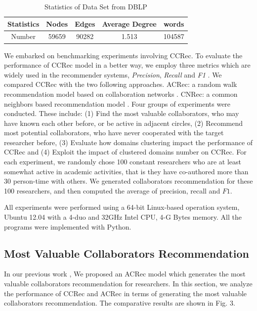 \documentclass[review]{elsarticle}
\begin{document}
\begin{table}
\renewcommand{\arraystretch}{1.2}
\centering
\caption{Statistics of Data Set from DBLP}
\begin{tabular}{|c|c|c|c|c|} \hline
Statistics &Nodes&Edges&Average Degree&words\\ \hline
Number & 59659 &90282 &1.513 &104587\\
\hline\end{tabular}
\end{table}


We embarked on benchmarking experiments involving CCRec. To evaluate the performance of CCRec model in a better way, we employ three metrics which are widely used in the recommender systems, \emph{Precision}, \emph{Recall} and \emph{F1} \cite{shani2011evaluating}. We compared CCRec with the two following approaches. ACRec: a random walk recommendation model based on collaboration networks \cite{li2014acrec}. CNRec: a common neighbors based recommendation model \cite{lopes2010collaboration}. Four groups of experiments were conducted. These include: (1) Find the most valuable collaborators, who may have known each other before, or be active in adjacent circles, (2) Recommend most potential collaborators, who have never cooperated with the target researcher before, (3) Evaluate how domains clustering impact the performance of CCRec and (4) Exploit the impact of clustered domains number on CCRec. For each experiment, we randomly chose 100 constant researchers who are at least somewhat active in academic activities, that is they have co-authored more than 30 person-time with others. We generated collaborators recommendation for these 100 researchers, and then computed the average of precision, recall and $F1$.

All experiments were performed using a 64-bit Linux-based operation system, Ubuntu 12.04 with a 4-duo and 32GHz Intel CPU, 4-G Bytes memory. All the programs were implemented with Python.

\subsection{Most Valuable Collaborators Recommendation}
In our previous work \cite{li2014acrec}, We proposed an ACRec model which generates the most valuable collaborators recommendation for researchers. In this section, we analyze the performance of CCRec and ACRec in terms of generating the most valuable collaborators recommendation. The comparative results are shown in Fig. 3.
\end{document}
